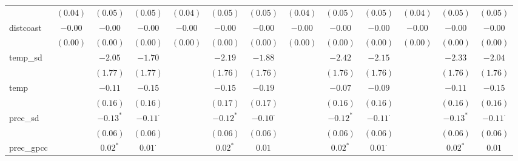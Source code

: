 \begin{sidewaystable}
\begin{center}
{\begin{tabular}{l c c c c c c c c c c c c}
                    & $(0.04)$      & $(0.05)$        & $(0.05)$        & $(0.04)$      & $(0.05)$        & $(0.05)$        & $(0.04)$        & $(0.05)$        & $(0.05)$        & $(0.04)$        & $(0.05)$        & $(0.05)$        \\
distcoast           & $-0.00$       & $-0.00$         & $-0.00$         & $-0.00$       & $-0.00$         & $-0.00$         & $-0.00$         & $-0.00$         & $-0.00$         & $-0.00$         & $-0.00$         & $-0.00$         \\
                    & $(0.00)$      & $(0.00)$        & $(0.00)$        & $(0.00)$      & $(0.00)$        & $(0.00)$        & $(0.00)$        & $(0.00)$        & $(0.00)$        & $(0.00)$        & $(0.00)$        & $(0.00)$        \\
temp\_sd            &               & $-2.05$         & $-1.70$         &               & $-2.19$         & $-1.88$         &                 & $-2.42$         & $-2.15$         &                 & $-2.33$         & $-2.04$         \\
                    &               & $(1.77)$        & $(1.77)$        &               & $(1.76)$        & $(1.76)$        &                 & $(1.76)$        & $(1.76)$        &                 & $(1.76)$        & $(1.76)$        \\
temp                &               & $-0.11$         & $-0.15$         &               & $-0.15$         & $-0.19$         &                 & $-0.07$         & $-0.09$         &                 & $-0.11$         & $-0.15$         \\
                    &               & $(0.16)$        & $(0.16)$        &               & $(0.17)$        & $(0.17)$        &                 & $(0.16)$        & $(0.16)$        &                 & $(0.16)$        & $(0.16)$        \\
prec\_sd            &               & $-0.13^{*}$     & $-0.11^{\cdot}$ &               & $-0.12^{*}$     & $-0.10^{\cdot}$ &                 & $-0.12^{*}$     & $-0.11^{\cdot}$ &                 & $-0.13^{*}$     & $-0.11^{\cdot}$ \\
                    &               & $(0.06)$        & $(0.06)$        &               & $(0.06)$        & $(0.06)$        &                 & $(0.06)$        & $(0.06)$        &                 & $(0.06)$        & $(0.06)$        \\
prec\_gpcc          &               & $0.02^{*}$      & $0.01^{\cdot}$  &               & $0.02^{*}$      & $0.01$          &                 & $0.02^{*}$      & $0.01^{\cdot}$  &                 & $0.02^{*}$      & $0.01$          \\

\end{tabular}}
\end{center}
\end{sidewaystable}
